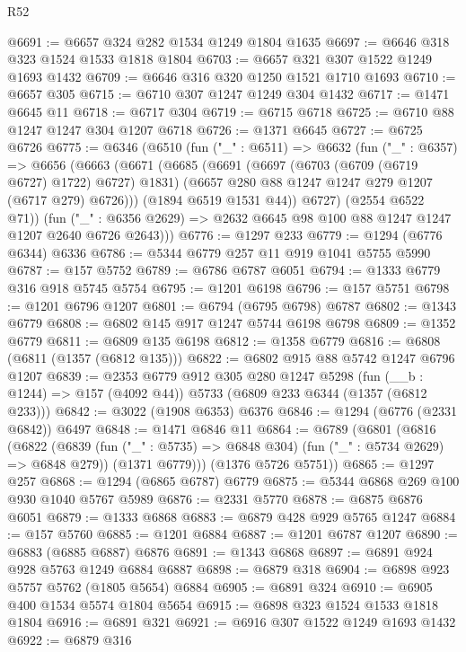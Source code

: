 \begin{lexlean}{R52}
\begin{coremodule}
@6691 := @6657 @324 @282 @1534 @1249 @1804 @1635
@6697 := @6646 @318 @323 @1524 @1533 @1818 @1804
@6703 := @6657 @321 @307 @1522 @1249 @1693 @1432
@6709 := @6646 @316 @320 @1250 @1521 @1710 @1693
@6710 := @6657 @305
@6715 := @6710 @307 @1247 @1249 @304 @1432
@6717 := @1471 @6645 @11
@6718 := @6717 @304
@6719 := @6715 @6718
@6725 := @6710 @88 @1247 @1247 @304 @1207 @6718
@6726 := @1371 @6645
@6727 := @6725 @6726
@6775 := @6346
    (@6510
      (fun ("_" : @6511) =>
      @6632
        (fun ("_" : @6357) =>
        @6656
          (@6663
            (@6671
              (@6685
                (@6691
                  (@6697 (@6703 (@6709 (@6719 @6727) @1722) @6727) @1831)
                  (@6657 @280 @88 @1247 @1247 @279 @1207 (@6717 @279) @6726)))
              (@1894 @6519 @1531 @44))
            @6727)
          (@2554 @6522 @71))
        (fun ("_" : @6356 @2629) => @2632 @6645 @98 @100 @88 @1247 @1247 @1207 @2640 @6726 @2643)))
@6776 := @1297 @233
@6779 := @1294 (@6776 @6344) @6336
@6786 := @5344 @6779 @257 @11 @919 @1041 @5755 @5990
@6787 := @157 @5752
@6789 := @6786 @6787 @6051
@6794 := @1333 @6779 @316 @918 @5745 @5754
@6795 := @1201 @6198
@6796 := @157 @5751
@6798 := @1201 @6796 @1207
@6801 := @6794 (@6795 @6798) @6787
@6802 := @1343 @6779
@6808 := @6802 @145 @917 @1247 @5744 @6198 @6798
@6809 := @1352 @6779
@6811 := @6809 @135 @6198
@6812 := @1358 @6779
@6816 := @6808 (@6811 (@1357 (@6812 @135)))
@6822 := @6802 @915 @88 @5742 @1247 @6796 @1207
@6839 := @2353
    @6779
    @912
    @305
    @280
    @1247
    @5298
    (fun (__b : @1244) => @157 (@4092 @44))
    @5733
    (@6809 @233 @6344 (@1357 (@6812 @233)))
@6842 := @3022 (@1908 @6353) @6376
@6846 := @1294 (@6776 (@2331 @6842)) @6497
@6848 := @1471 @6846 @11
@6864 := @6789
    (@6801
      (@6816
        (@6822
          (@6839 (fun ("_" : @5735) => @6848 @304) (fun ("_" : @5734 @2629) => @6848 @279))
          (@1371 @6779)))
      (@1376 @5726 @5751))
@6865 := @1297 @257
@6868 := @1294 (@6865 @6787) @6779
@6875 := @5344 @6868 @269 @100 @930 @1040 @5767 @5989
@6876 := @2331 @5770
@6878 := @6875 @6876 @6051
@6879 := @1333 @6868
@6883 := @6879 @428 @929 @5765 @1247
@6884 := @157 @5760
@6885 := @1201 @6884
@6887 := @1201 @6787 @1207
@6890 := @6883 (@6885 @6887) @6876
@6891 := @1343 @6868
@6897 := @6891 @924 @928 @5763 @1249 @6884 @6887
@6898 := @6879 @318
@6904 := @6898 @923 @5757 @5762 (@1805 @5654) @6884
@6905 := @6891 @324
@6910 := @6905 @400 @1534 @5574 @1804 @5654
@6915 := @6898 @323 @1524 @1533 @1818 @1804
@6916 := @6891 @321
@6921 := @6916 @307 @1522 @1249 @1693 @1432
@6922 := @6879 @316

\end{coremodule}
\end{lexlean}
